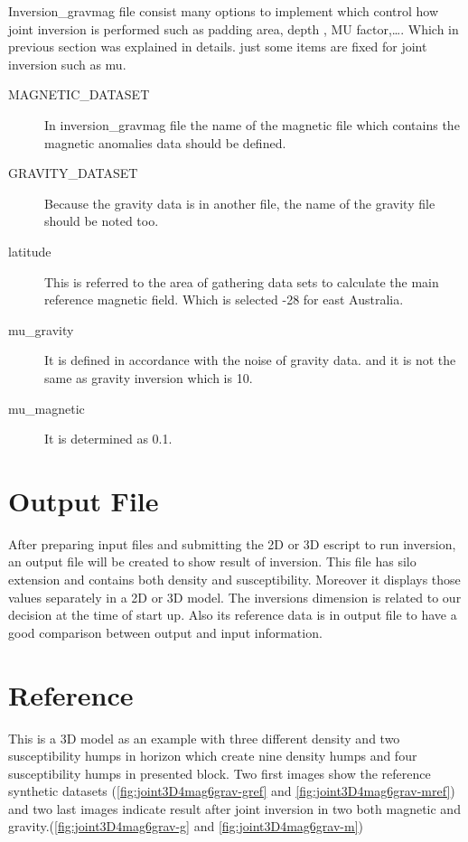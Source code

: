 Inversion_gravmag file consist many options to implement which control how joint inversion is performed such as padding area, depth , MU factor,\ldots. Which in previous section was explained in details. just some items are fixed for joint inversion such as mu.


\begin{description} 
\item[MAGNETIC_DATASET]In inversion_gravmag file the name of the magnetic file which contains the magnetic anomalies data should be defined.

\item[GRAVITY_DATASET]Because the gravity data is in another file, the name of the gravity file should be noted too.
	
\item[latitude]This is referred to the area of gathering data sets to calculate the main reference magnetic field. Which is selected -28 for east Australia.


\item[mu_gravity]It is defined in accordance with the noise of gravity data. and it is not the same as gravity inversion which is 10.

\item[mu_magnetic]It is determined as 0.1.

\end{description}


\section{Output File}

After preparing input files and submitting the 2D or 3D escript to run inversion, an output file will be created to show result of inversion. This file has silo extension and contains both density and susceptibility. Moreover it displays those values separately in a 2D or 3D model. The inversions dimension is related to our decision at the time of start up. Also its reference data is in output file to have a good comparison between output and input information.

\section{Reference}

This is a 3D model as an example with three different density and two susceptibility humps in horizon which create nine density humps and four susceptibility humps in presented block. Two first images show the reference synthetic datasets (\ref{fig:joint3D4mag6grav-gref} and \ref{fig:joint3D4mag6grav-mref}) and two last images indicate result after joint inversion in two both magnetic and gravity.(\ref{fig:joint3D4mag6grav-g} and \ref{fig:joint3D4mag6grav-m})
 
